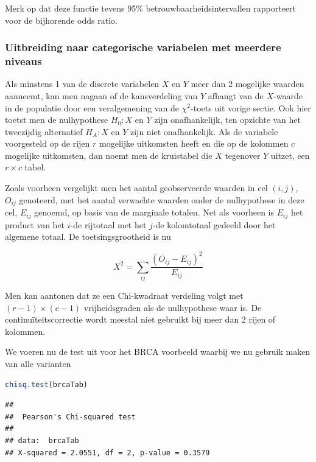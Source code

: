 \documentclass[
  12pt,dutch,coursenotes]{book}
\theoremstyle{definition}
\theoremstyle{definition}
\theoremstyle{definition}
\theoremstyle{definition}
\theoremstyle{remark}
\begin{document}
Merk op dat deze functie tevens 95\% betrouwbaarheidsintervallen rapporteert voor de bijhorende odds ratio.

\hypertarget{uitbreiding-naar-categorische-variabelen-met-meerdere-niveaus}{%
\subsubsection{Uitbreiding naar categorische variabelen met meerdere niveaus}\label{uitbreiding-naar-categorische-variabelen-met-meerdere-niveaus}}

Als minstens 1 van de discrete variabelen \(X\) en \(Y\) meer dan 2 mogelijke
waarden aanneemt, kan men nagaan of de kansverdeling van \(Y\) afhangt van de \(X\)-waarde in de populatie door een veralgemening van de \(\chi^2\)-toets
uit vorige sectie. Ook hier toetst men de nulhypothese \(H_0: X\) en \(Y\) zijn
onafhankelijk, ten opzichte van het tweezijdig alternatief \(H_A: X\) en \(Y\)
zijn niet onafhankelijk. Als de variabele voorgesteld op de rijen \(r\)
mogelijke uitkomsten heeft en die op de kolommen \(c\) mogelijke uitkomsten,
dan noemt men de kruistabel die \(X\) tegenover \(Y\) uitzet, een \(r \times c\)
tabel.

Zoals voorheen vergelijkt men het aantal geobserveerde waarden in cel \((i,j)\), \(O_{ij}\) genoteerd, met het aantal verwachte waarden onder de nulhypothese
in deze cel, \(E_{ij}\) genoemd, op basis van de marginale totalen. Net als
voorheen is \(E_{ij}\) het product van het \(i\)-de rijtotaal met het \(j\)-de
kolomtotaal gedeeld door het algemene totaal. De toetsingsgrootheid is nu

\begin{equation*}
X^2 = \sum_{ij} \frac{\left (O_{ij} - E_{ij}\right)^2 }{ E_{ij}}
\end{equation*}

Men kan aantonen dat ze een Chi-kwadraat verdeling volgt met \((r-1) \times (c-1)\) vrijheidsgraden als de nulhypothese waar is. De continuïteitscorrectie wordt meestal niet gebruikt bij meer dan 2 rijen of
kolommen.

We voeren nu de test uit voor het BRCA voorbeeld waarbij we nu gebruik maken van alle varianten

\begin{lstlisting}[language=R]
chisq.test(brcaTab)
\end{lstlisting}

\begin{lstlisting}
## 
##  Pearson's Chi-squared test
## 
## data:  brcaTab
## X-squared = 2.0551, df = 2, p-value = 0.3579
\end{lstlisting}
\end{document}
